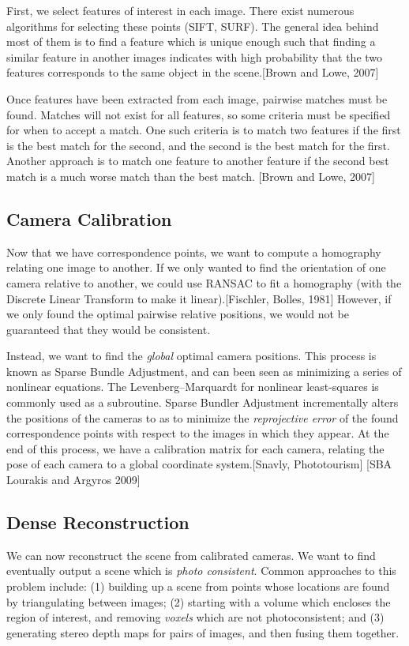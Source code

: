 \documentclass[10pt,twocolumn,letterpaper]{article}
\begin{document}
First, we select features of interest in each image. There exist numerous algorithms for selecting these points (SIFT, SURF). The general idea behind most of them is to find a feature which is unique enough such that finding a similar feature in another images indicates with high probability that the two features corresponds to the same object in the scene.[Brown and Lowe, 2007]

Once features have been extracted from each image, pairwise matches must be found. Matches will not exist for all features, so some criteria must be specified for when to accept a match. One such criteria is to match two features if the first is the best match for the second, and the second is the best match for the first. Another approach is to match one feature to another feature if the second best match is a much worse match than the best match. [Brown and Lowe, 2007]

\subsection{Camera Calibration}

Now that we have correspondence points, we want to compute a homography relating one image to another. If we only wanted to find the orientation of one camera relative to another, we could use RANSAC to fit a homography (with the Discrete Linear Transform to make it linear).[Fischler, Bolles, 1981] However, if we only found the optimal pairwise relative positions, we would not be guaranteed that they would be consistent.

Instead, we want to find the \emph{global} optimal camera positions. This process is known as Sparse Bundle Adjustment, and can been seen as minimizing a series of nonlinear equations. The  Levenberg–Marquardt for nonlinear least-squares is commonly used as a subroutine. Sparse Bundler Adjustment incrementally alters the positions of the cameras to as to minimize the \emph{reprojective error} of the found correspondence points with respect to the images in which they appear. At the end of this process, we have a calibration matrix for each camera, relating the pose of each camera to a global coordinate system.[Snavly, Phototourism] [SBA Lourakis and Argyros 2009]

\subsection{Dense Reconstruction}

We can now reconstruct the scene from calibrated cameras. We want to find eventually output a scene which is \emph{photo consistent}. Common approaches to this problem include: (1) building up a scene from points whose locations are found by triangulating between images; (2) starting with a volume which encloses the region of interest, and removing \emph{voxels} which are not photoconsistent; and (3) generating stereo depth maps for pairs of images, and then fusing them together.
\end{document}
